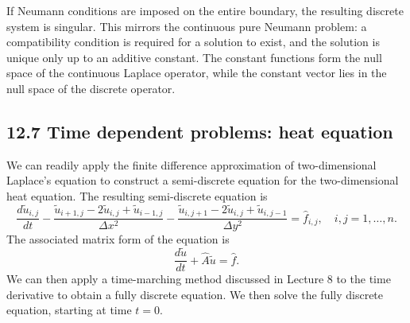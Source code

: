 \begin{nremark}[][12.1]
    If Neumann conditions are imposed on the entire boundary, the resulting discrete system is singular. This mirrors the continuous pure Neumann problem: a compatibility condition is required for a solution to exist, and the solution is unique only up to an additive constant. The constant functions form the null space of the continuous Laplace operator, while the constant vector lies in the null space of the discrete operator.
\end{nremark}

\subsection{12.7 Time dependent problems: heat equation}
We can readily apply the finite difference approximation of two-dimensional Laplace's equation to construct a semi-discrete equation for the two-dimensional heat equation. The resulting semi-discrete equation is
\[\frac{d\tilde{u}_{i,j}}{dt} - \frac{\tilde{u}_{i+1,j} - 2\tilde{u}_{i,j} + \tilde{u}_{i-1,j}}{\Delta x^2} - \frac{\tilde{u}_{i,j+1} - 2\tilde{u}_{i,j} + \tilde{u}_{i,j-1}}{\Delta y^2} = \hat{f}_{i,j}, \quad i, j = 1, \dots, n.\]
The associated matrix form of the equation is
\[\frac{d\tilde{u}}{dt} + \hat{A}\tilde{u} = \hat{f}.\]
We can then apply a time-marching method discussed in Lecture 8 to the time derivative to obtain a fully discrete equation. We then solve the fully discrete equation, starting at time $t = 0$.

